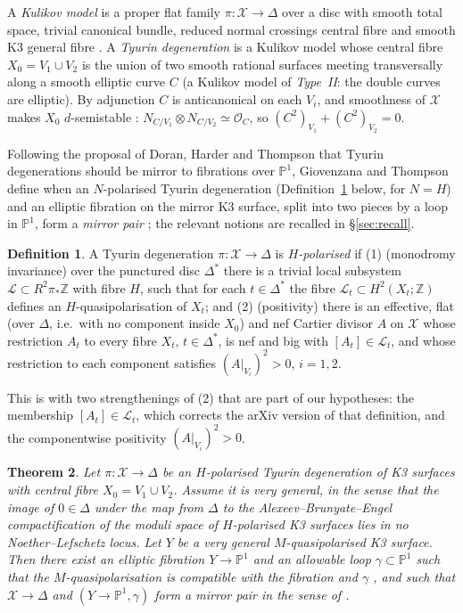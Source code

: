 \documentclass[11pt]{article}
\newcommand{\Z}{\mathbb Z}
\newcommand{\PP}{\mathbb P}
\newcommand{\calX}{\mathcal X}
\newcommand{\calL}{\mathcal L}
\newtheorem{theorem}{Theorem}[section]
\theoremstyle{definition}
\newtheorem{definition}[theorem]{Definition}
\theoremstyle{remark}
\begin{document}
A \emph{Kulikov model} is a proper flat family
\(\pi\colon\calX\to\Delta\) over a disc with smooth total space,
trivial canonical bundle, reduced normal crossings central fibre and
smooth K3 general fibre \cite{Ku}. A \emph{Tyurin degeneration} is a
Kulikov model whose central fibre \(X_0=V_1\cup V_2\) is the union of
two smooth rational surfaces meeting transversally along a smooth
elliptic curve \(C\) (a Kulikov model of \emph{Type~II}: the double
curves are elliptic). By adjunction \(C\) is anticanonical on each
\(V_i\), and smoothness of \(\calX\) makes \(X_0\) \(d\)-semistable
\cite{Fr83}: \(N_{C/V_1}\otimes N_{C/V_2}\simeq\mathcal O_C\), so
\((C^2)_{V_1}+(C^2)_{V_2}=0\).

Following the proposal of Doran, Harder and Thompson \cite{DHT} that
Tyurin degenerations should be mirror to fibrations over \(\PP^1\),
Giovenzana and Thompson \cite{GT} define when an \(N\)-polarised
Tyurin degeneration (Definition~\ref{def:Hpol} below, for \(N=H\)) and
an elliptic fibration on the mirror K3 surface, split into two pieces
by a loop in \(\PP^1\), form a \emph{mirror pair}
\cite[Definition~5.1]{GT}; the relevant notions are recalled in
\S\ref{sec:recall}.

\begin{definition}\label{def:Hpol}
A Tyurin degeneration \(\pi\colon\calX\to\Delta\) is
\emph{\(H\)-polarised} if
(1) (monodromy invariance) over the punctured disc \(\Delta^*\)
there is a trivial local subsystem \(\calL\subset R^2\pi_*\Z\) with
fibre \(H\), such that for each \(t\in\Delta^*\) the fibre
\(\calL_t\subset H^2(X_t;\Z)\) defines an \(H\)-quasipolarisation of
\(X_t\); and
(2) (positivity) there is an effective, flat (over \(\Delta\), i.e.\
with no component inside \(X_0\)) and nef Cartier divisor
\(A\) on \(\calX\) whose restriction \(A_t\) to every fibre \(X_t\),
\(t\in\Delta^*\), is nef and big with \([A_t]\in\calL_t\), and whose
restriction to each component satisfies \((A|_{V_i})^2>0\),
\(i=1,2\).
\end{definition}

This is \cite[Definition~3.20]{GT} with two strengthenings of (2)
that are part of our hypotheses: the membership \([A_t]\in\calL_t\),
which corrects the arXiv version of that definition, and the
componentwise positivity \((A|_{V_i})^2>0\).

\begin{theorem}\label{thm:main}
Let \(\pi\colon\calX\to\Delta\) be an \(H\)-polarised Tyurin
degeneration of K3 surfaces with central fibre \(X_0=V_1\cup V_2\).
Assume it is very general, in the sense that the image of
\(0\in\Delta\) under the map from \(\Delta\) to the
Alexeev--Brunyate--Engel compactification \cite{ABE} of the moduli
space of \(H\)-polarised K3 surfaces lies in no Noether--Lefschetz
locus. Let \(Y\) be a very general \(M\)-quasipolarised K3 surface.
Then there exist an elliptic fibration \(Y\to\PP^1\) and an allowable
loop \(\gamma\subset\PP^1\) \cite[Definition~4.11]{GT} such that the
\(M\)-quasipolarisation is compatible with the fibration and
\(\gamma\) \cite[Definition~4.21]{GT}, and such that \(\calX\to\Delta\)
and \((Y\to\PP^1,\gamma)\) form a mirror pair in the sense of
\cite[Definition~5.1]{GT}.
\end{theorem}
\end{document}
